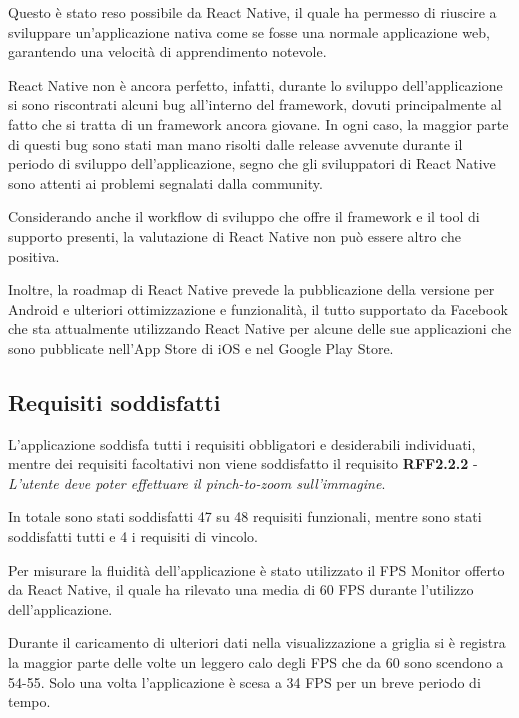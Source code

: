 Questo è stato reso possibile da React Native, il quale ha permesso di riuscire a sviluppare un'applicazione nativa come se fosse una normale applicazione web, garantendo una velocità di apprendimento notevole.

React Native non è ancora perfetto, infatti, durante lo sviluppo dell'applicazione si sono riscontrati alcuni bug all'interno del framework, dovuti principalmente al fatto che si tratta di un framework ancora giovane.
In ogni caso, la maggior parte di questi bug sono stati man mano risolti dalle release avvenute durante il periodo di sviluppo dell'applicazione, segno che gli sviluppatori di React Native sono attenti ai problemi segnalati dalla community.

Considerando anche il workflow di sviluppo che offre il framework e il tool di supporto presenti, la valutazione di React Native non può essere altro che positiva.

Inoltre, la roadmap di React Native prevede la pubblicazione della versione per Android e ulteriori ottimizzazione e funzionalità, il tutto supportato da Facebook che sta attualmente utilizzando React Native per alcune delle sue applicazioni che sono pubblicate nell'App Store di iOS e nel Google Play Store.


\subsection{Requisiti soddisfatti}

L'applicazione soddisfa tutti i requisiti obbligatori e desiderabili individuati, mentre dei requisiti facoltativi non viene soddisfatto il requisito
\textbf{RFF2.2.2} - \textit{L'utente deve poter effettuare il pinch-to-zoom sull'immagine}.

In totale sono stati soddisfatti 47 su 48 requisiti funzionali, mentre sono stati soddisfatti tutti e 4 i requisiti di vincolo.

Per misurare la fluidità dell'applicazione è stato utilizzato il FPS Monitor offerto da React Native, il quale ha rilevato una media di 60 FPS durante l'utilizzo dell'applicazione.

Durante il caricamento di ulteriori dati nella visualizzazione a griglia si è registra la maggior parte delle volte un leggero calo degli FPS che da 60 sono scendono a 54-55.
Solo una volta l'applicazione è scesa a 34 FPS per un breve periodo di tempo.

